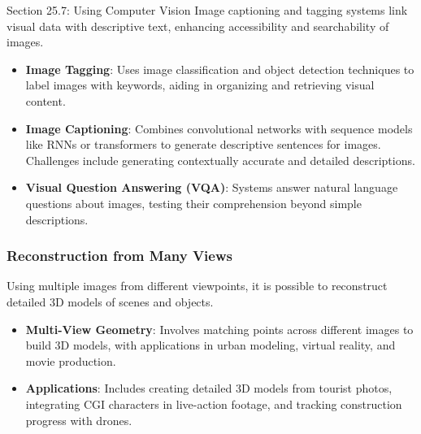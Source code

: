 \begin{notes}{Section 25.7: Using Computer Vision}
    Image captioning and tagging systems link visual data with descriptive text, enhancing accessibility and searchability of images.
    
    \begin{highlight}
    
        \begin{itemize}
            \item \textbf{Image Tagging}: Uses image classification and object detection techniques to label images with keywords, aiding in organizing and retrieving visual content.
            \item \textbf{Image Captioning}: Combines convolutional networks with sequence models like RNNs or transformers to generate descriptive sentences for images. Challenges include generating contextually 
            accurate and detailed descriptions.
            \item \textbf{Visual Question Answering (VQA)}: Systems answer natural language questions about images, testing their comprehension beyond simple descriptions.
        \end{itemize}
    
    \end{highlight}
    
    \subsubsection*{Reconstruction from Many Views}
    
    Using multiple images from different viewpoints, it is possible to reconstruct detailed 3D models of scenes and objects.
    
    \begin{highlight}
    
        \begin{itemize}
            \item \textbf{Multi-View Geometry}: Involves matching points across different images to build 3D models, with applications in urban modeling, virtual reality, and movie production.
            \item \textbf{Applications}: Includes creating detailed 3D models from tourist photos, integrating CGI characters in live-action footage, and tracking construction progress with drones.
        \end{itemize}
    
    \end{highlight}
    

\end{notes}
